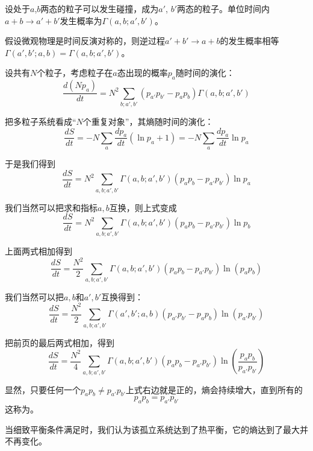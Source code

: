 \documentclass[CJK]{beamer}
\begin{document}
\begin{frame}
\bch
{\small
\bitem
\item{设处于$a$,$b$两态的粒子可以发生碰撞，成为$a'$, $b'$两态的粒子。单位时间内$a+b\rightarrow a'+b'$发生概率为$\Gamma(a, b; a', b')$。}
\item{{\blue 假设微观物理是时间反演对称的}，则逆过程$a'+b'\rightarrow a+b$的发生概率相等$\Gamma(a', b'; a, b) = \Gamma(a, b; a', b')$。}
\item{设共有$N$个粒子，考虑粒子在$a$态出现的概率$p_a$随时间的演化：
$$\frac{d (Np_a)}{dt} = N^2\sum_{b;a',b'} (p_{a'}p_{b'}  -  p_a p_b) \Gamma(a, b; a', b')$$
}
\item{把多粒子系统看成“$N$个重复对象”，其熵随时间的演化：
$$\frac{d S}{dt} = -N\sum_a\frac{dp_a}{dt}(\ln p_a+1) = -N\sum_a\frac{dp_a}{dt}\ln p_a  $$
}
\eitem
}
\ech
\end{frame}

\begin{frame}
\bch
{\small
\bitem
\item{于是我们得到
$$\frac{d S}{dt} =  N^2 \sum_{a, b; a', b'}\Gamma(a, b; a', b') \left(p_ap_b - p_{a'}p_{b'}\right)\ln p_a    $$
}
\item{我们当然可以把求和指标$a, b$互换，则上式变成
$$\frac{d S}{dt} =  N^2 \sum_{a, b; a', b'}\Gamma(a, b; a', b') \left(p_ap_b - p_{a'}p_{b'}\right)\ln p_b    $$
}
\item{上面两式相加得到
$$\frac{d S}{dt} =  \frac{N^2}{2} \sum_{a, b; a', b'}\Gamma(a, b; a', b') \left(p_ap_b - p_{a'}p_{b'}\right)\ln(p_ap_b)    $$
}
\item{我们当然可以把$a,b$和$a',b'$互换得到：
$$\frac{d S}{dt} =  \frac{N^2}{2} \sum_{a, b; a', b'}\Gamma(a', b'; a, b) \left(p_{a'}p_{b'} - p_ap_b\right)\ln(p_{a'}p_{b'})    $$
}

\eitem
}
\ech
\end{frame}

\begin{frame}
\bch
{\small
\bitem
\item{把前页的最后两式相加，得到
$$\frac{d S}{dt} =  \frac{N^2}{4} \sum_{a, b; a', b'}\Gamma(a, b; a', b') \left(p_ap_b - p_{a'}p_{b'}\right)\ln(\frac{p_ap_b}{p_{a'}p_{b'}})    $$
}
\eitem

显然，只要任何一个$p_ap_b\ne p_{a'}p_{b'}$上式右边就是正的，熵会持续增大，直到{\blue 所有的 
$$p_ap_b = p_{a'}p_{b'}$$}
这称为{。}

当细致平衡条件满足时，我们认为该孤立系统达到了热平衡，它的熵达到了最大并不再变化。
}

\ech
\end{frame}
\end{document}
